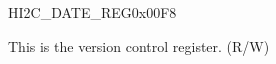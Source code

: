 \begin{register}{H}{I2C\_DATE\_REG}{0x{}00F8}\label{regdesc:I2CDATEREG}
%
\regnewline%
\begin{regdesc}\begin{reglist}
\label{fielddesc:I2CDATE}\item [I2C\_DATE] This is the version control register. (R/W)
\end{reglist}\end{regdesc}
\end{register}
